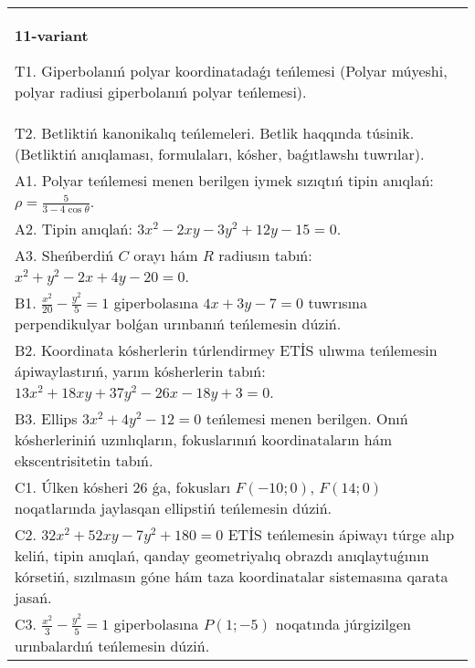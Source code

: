 \documentclass{article}
\begin{document}
\begin{tabular}{m{17cm}}
\textbf{11-variant}
\newline

T1. Giperbolanıń polyar koordinatadaǵı teńlemesi (Polyar múyeshi, polyar radiusi giperbolanıń polyar teńlemesi).\\

T2. Betliktiń kanonikalıq teńlemeleri. Betlik haqqında túsinik. (Betliktiń anıqlaması, formulaları, kósher, baǵıtlawshı tuwrılar).\\

A1. Polyar teńlemesi menen berilgen iymek sızıqtıń tipin anıqlań: $\rho=\frac{5}{3-4\cos\theta}$.\\

A2. Tipin anıqlań: $3 x^{2}-2 xy-3 y^{2}+12 y-15=0$.\\

A3. Sheńberdiń $C$ orayı hám $R$ radiusın tabıń: $x^2+y^2-2 x+4 y-20=0$.\\

B1. $\frac{x^{2}}{20} - \frac{y^{2}}{5} = 1$ giperbolasına $4x + 3y - 7 = 0$ tuwrısına perpendikulyar bolǵan urınbanıń teńlemesin dúziń.  \\

B2. Koordinata kósherlerin túrlendirmey ETİS ulıwma teńlemesin ápiwaylastırıń, yarım kósherlerin tabıń: $13x^{2} + 18xy + 37y^{2} - 26x - 18y + 3 = 0$.  \\

B3. Ellips $3x^{2} + 4y^{2} - 12 = 0$ teńlemesi menen berilgen. Onıń kósherleriniń uzınlıqların, fokuslarınıń koordinataların hám ekscentrisitetin tabıń.  \\

C1. Úlken kósheri 26 ǵa, fokusları $F( - 10;0)$, $F(14;0)$ noqatlarında jaylasqan ellipstiń teńlemesin dúziń.  \\

C2. $32x^{2} + 52xy - 7y^{2} + 180 = 0$ ETİS teńlemesin ápiwayı túrge alıp keliń, tipin anıqlań, qanday geometriyalıq obrazdı anıqlaytuǵının kórsetiń, sızılmasın góne hám taza koordinatalar sistemasına qarata jasań.  \\

C3. $\frac{x^{2}}{3} - \frac{y^{2}}{5} = 1$ giperbolasına $P(1; - 5)$ noqatında júrgizilgen urınbalardıń teńlemesin dúziń.\\

\end{tabular}
\vspace{1cm}
\end{document}
